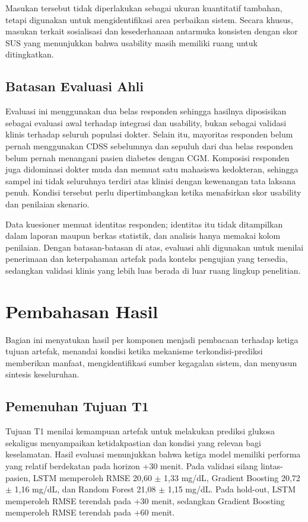Masukan tersebut tidak diperlakukan sebagai ukuran kuantitatif tambahan, tetapi digunakan untuk mengidentifikasi area perbaikan sistem. Secara khusus,
masukan terkait sosialisasi dan kesederhanaan antarmuka konsisten dengan skor SUS yang menunjukkan bahwa usability masih memiliki ruang untuk ditingkatkan.

\subsection{Batasan Evaluasi Ahli}
\label{subsec:bab6-batasan-evaluasi-ahli}

Evaluasi ini menggunakan dua belas responden sehingga hasilnya diposisikan sebagai evaluasi awal terhadap integrasi dan usability, bukan sebagai validasi
klinis terhadap seluruh populasi dokter. Selain itu, mayoritas responden belum pernah menggunakan CDSS sebelumnya dan sepuluh dari dua belas responden belum
pernah menangani pasien diabetes dengan CGM. Komposisi responden juga didominasi dokter muda dan memuat satu mahasiswa kedokteran, sehingga sampel ini tidak
seluruhnya terdiri atas klinisi dengan kewenangan tata laksana penuh. Kondisi tersebut perlu dipertimbangkan ketika menafsirkan skor usability dan penilaian
skenario.

Data kuesioner memuat identitas responden; identitas itu tidak ditampilkan dalam laporan maupun berkas statistik, dan analisis hanya memakai kolom
penilaian. Dengan batasan-batasan di atas, evaluasi ahli digunakan untuk menilai penerimaan dan keterpahaman artefak pada konteks pengujian yang tersedia,
sedangkan validasi klinis yang lebih luas berada di luar ruang lingkup penelitian.

\section{Pembahasan Hasil}
\label{sec:bab6-pembahasan-hasil}

Bagian ini menyatukan hasil per komponen menjadi pembacaan terhadap ketiga tujuan artefak, menandai kondisi ketika mekanisme terkondisi-prediksi memberikan
manfaat, mengidentifikasi sumber kegagalan sistem, dan menyusun sintesis keseluruhan.

\subsection{Pemenuhan Tujuan T1}
\label{subsec:bab6-pemenuhan-t1}

Tujuan T1 menilai kemampuan artefak untuk melakukan prediksi glukosa sekaligus menyampaikan ketidakpastian dan kondisi yang relevan bagi keselamatan.
Hasil evaluasi menunjukkan bahwa ketiga model memiliki performa yang relatif berdekatan pada horizon +30 menit. Pada validasi silang lintas-pasien,
LSTM memperoleh RMSE 20,60 $\pm$ 1,33 mg/dL, Gradient Boosting 20,72 $\pm$ 1,16 mg/dL, dan Random Forest 21,08 $\pm$ 1,15 mg/dL. Pada hold-out,
LSTM memperoleh RMSE terendah pada +30 menit, sedangkan Gradient Boosting memperoleh RMSE terendah pada +60 menit.

